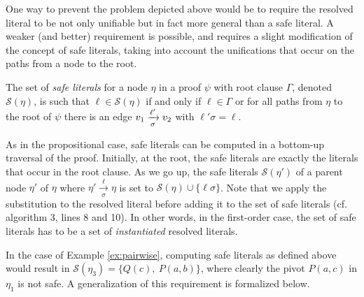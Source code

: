 One way to prevent the problem depicted above would be to require the resolved literal to be not only unifiable but in fact more general than a safe literal. A weaker (and better) requirement is possible, and requires a slight modification of the concept of safe literals, taking into account the unifications that occur on the paths from a node to the root. 


\begin{definition}
The set of \emph{safe literals} for a node $\eta$ in a proof $\psi$ with root clause $\Gamma$, denoted $\mathcal{S}(\eta)$, is such that $\ell \in \mathcal{S}(\eta)$ if and only if $\ell \in \Gamma$ or for all paths from $\eta$ to the root of $\psi$ there is an edge $v_1
\xrightarrow[\sigma]{\ell'} v_2$ with $\ell' \sigma = \ell$.
\end{definition}

As in the propositional case, safe literals can be computed in a bottom-up traversal of the proof. Initially, at the root, the safe literals are exactly the literals that occur in the root clause. As we go up, the safe literals $\mathcal{S}(\eta')$ of a parent node $\eta'$ of $\eta$ where $\eta'
\xrightarrow[\sigma]{\ell} \eta$ is set to $\mathcal{S}(\eta) \cup \{ \ell \sigma \}$. Note that we apply the substitution to the resolved literal before adding it to the set of safe literals (cf. algorithm 3, lines 8 and 10). In other words, in the first-order case, the set of safe literals has to be a set of \emph{instantiated} resolved literals.

In the case of Example \ref{ex:pairwise}, computing safe literals as defined above would result in $\mathcal{S}(\eta_3)=\{Q(c),~P(a,b)\}$, where clearly the pivot $P(a,c)$ in $\eta_1$ is not safe. A generalization of this requirement is formalized below.



